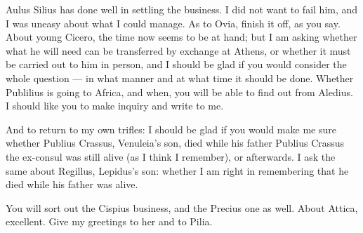 

 Aulus Silius has done well in settling the business. I did not want to fail him, and I was uneasy about what I could manage. As to Ovia, finish it off, as you say. About young Cicero, the time now seems to be at hand; but I am asking whether what he will need can be transferred by exchange at Athens, or whether it must be carried out to him in person, and I should be glad if you would consider the whole question --- in what manner and at what time it should be done. Whether Publilius is going to Africa, and when, you will be able to find out from Aledius. I should like you to make inquiry and write to me.

 And to return to my own trifles: I should be glad if you would make me sure whether Publius Crassus, Venuleia's son, died while his father Publius Crassus the ex-consul was still alive (as I think I remember), or afterwards. I ask the same about Regillus, Lepidus's son: whether I am right in remembering that he died while his father was alive.

 You will sort out the Cispius business, and the Precius one as well. About Attica, excellent. Give my greetings to her and to Pilia.
